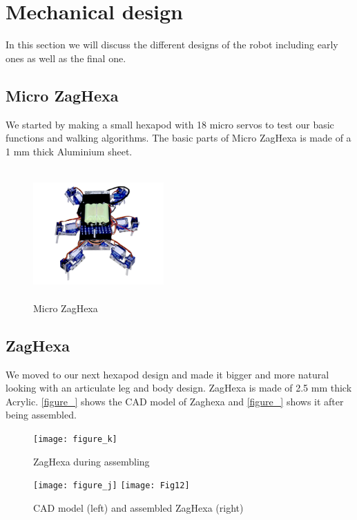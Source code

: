 \section{Mechanical design}
\noindent In this section we will discuss the different designs of the robot including early ones as well as the final one.
\subsection{Micro ZagHexa}
We started by making a small hexapod with 18 micro servos to test our basic functions and walking algorithms. The basic parts of Micro ZagHexa is made of a 1 mm thick Aluminium sheet.

\begin{figure}[H]
	\centering
	\includegraphics[width=5cm,height=5cm]{figures/uZagHexaFinal.png}
	\caption{Micro ZagHexa}
	\label{figure_i}
\end{figure}

\subsection{ZagHexa}
We moved to our next hexapod design and made it bigger and more natural looking with an articulate leg and body design. ZagHexa is made of 2.5 mm thick Acrylic. \ref{figure_} shows the CAD model of Zaghexa and \ref{figure_} shows it after being assembled.
\begin{figure}[H]
	\centering
	\texttt{[image: figure\_k]}
	\caption{ZagHexa during assembling}
	\label{figure_k}
\end{figure}
\begin{figure}[H]
	\centering
   \texttt{[image: figure\_j]}
	\texttt{[image: Fig12]}
	\caption{CAD model (left) and assembled ZagHexa (right)}
	\label{figure_l}
\end{figure}

